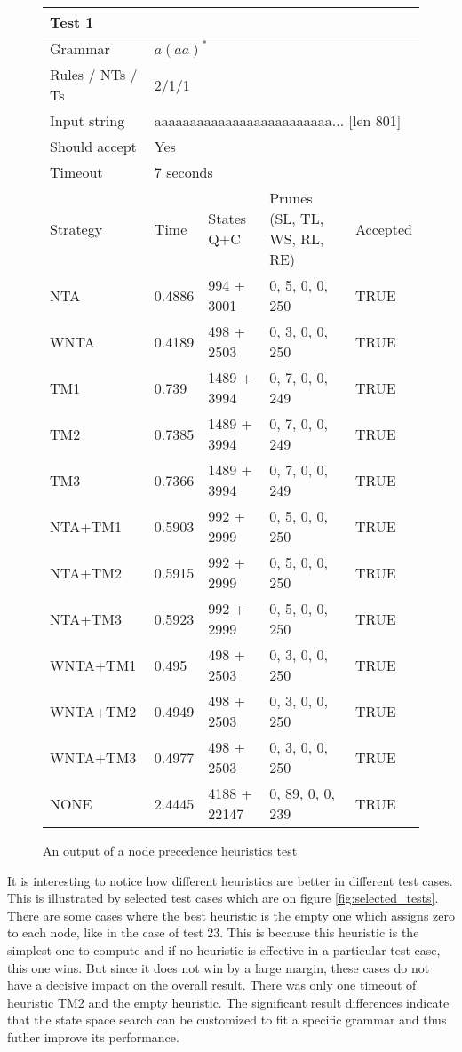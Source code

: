 \begin{figure}[h!]
  \caption{An output of a node precedence heuristics test}
  \label{tab:node_heuristics_table}
\begin{tabular}{ |l|l|l|l|l|  }
  \hline
  \multicolumn{5}{|l|}{Test 1} \\
  \hline
  Grammar & \multicolumn{4}{|l|}{$a(aa)^*$} \\
  Rules / NTs / Ts & \multicolumn{4}{|l|}{2/1/1} \\
  Input string & \multicolumn{4}{|l|}{aaaaaaaaaaaaaaaaaaaaaaaaa... [len 801]} \\
  Should accept & \multicolumn{4}{|l|}{Yes} \\
  Timeout & \multicolumn{4}{|l|}{7 seconds} \\
  \hline
  Strategy & Time & States Q+C & Prunes (SL, TL, WS, RL, RE)& Accepted \\
  \hline
 NTA & 0.4886 & 994 + 3001  & 0, 5, 0, 0, 250 & TRUE \\
 WNTA & 0.4189 & 498 + 2503 & 0, 3, 0, 0, 250 & TRUE  \\
 TM1 & 0.739 & 1489 + 3994 & 0, 7, 0, 0, 249  & TRUE  \\
 TM2 & 0.7385 & 1489 + 3994 & 0, 7, 0, 0, 249 & TRUE  \\
 TM3 & 0.7366 & 1489 + 3994 & 0, 7, 0, 0, 249  & TRUE  \\
 NTA+TM1 & 0.5903 & 992 + 2999 & 0, 5, 0, 0, 250 & TRUE  \\
 NTA+TM2 & 0.5915 & 992 + 2999 & 0, 5, 0, 0, 250 & TRUE  \\
 NTA+TM3 & 0.5923 & 992 + 2999 & 0, 5, 0, 0, 250 & TRUE  \\
 WNTA+TM1 & 0.495 & 498 + 2503 & 0, 3, 0, 0, 250 & TRUE  \\
 WNTA+TM2 & 0.4949 & 498 + 2503 & 0, 3, 0, 0, 250 & TRUE  \\
 WNTA+TM3 & 0.4977 & 498 + 2503 & 0, 3, 0, 0, 250 & TRUE  \\
 NONE & 2.4445 & 4188 + 22147 & 0, 89, 0, 0, 239 & TRUE  \\
  \hline
\end{tabular}
\end{figure}

It is interesting to notice how different heuristics are better in different test cases. This is illustrated by selected test cases which are on figure \ref{fig:selected_tests}. There are some cases where the best heuristic is the empty one which assigns zero to each node, like in the case of test 23. This is because this heuristic is the simplest one to compute and if no heuristic is effective in a particular test case, this one wins. But since it does not win by a large margin, these cases do not have a decisive impact on the overall result. There was only one timeout of heuristic TM2 and the empty heuristic. The significant result differences indicate that the state space search can be customized to fit a specific grammar and thus futher improve its performance.

